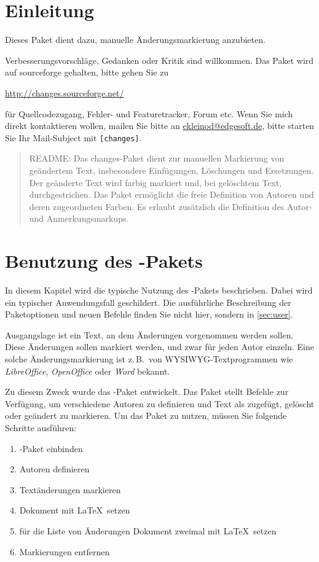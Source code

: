 \section{Einleitung}

Dieses Paket dient dazu, manuelle Änderungsmarkierung anzubieten.

Verbesserungsvorschläge, Gedanken oder Kritik sind willkommen.
Das Paket wird auf sourceforge gehalten, bitte gehen Sie zu

\url{http://changes.sourceforge.net/}

für Quellcodezugang, Fehler- und Featuretracker, Forum etc.
Wenn Sie mich direkt kontaktieren wollen, mailen Sie bitte an \href{mailto:ekleinod@edgesoft.de}{ekleinod@edgesoft.de}, bitte starten Sie Ihr Mail-Subject mit \texttt{[changes]}.

\begin{quote}
	\small\textsc{README:}
	Das changes-Paket dient zur manuellen Markierung von geändertem Text, insbesondere Einfügungen, Löschungen und Ersetzungen.
	Der geänderte Text wird farbig markiert und, bei gelöschtem Text, durchgestrichen.
	Das Paket ermöglicht die freie Definition von Autoren und deren zugeordneten Farben.
	Es erlaubt zusätzlich die Definition des Autor- und Anmerkungsmarkups.
\end{quote}

\section{Benutzung des -Pakets}
\label{sec:usage}

In diesem Kapitel wird die typische Nutzung des -Pakets beschrieben.
Dabei wird ein typischer Anwendungsfall geschildert.
Die ausführliche Beschreibung der Paketoptionen und neuen Befehle finden Sie nicht hier, sondern in \autoref{sec:user}.

Ausgangslage ist ein Text, an dem Änderungen vorgenommen werden sollen.
Diese Änderungen sollen markiert werden, und zwar für jeden Autor einzeln.
Eine solche Änderungsmarkierung ist z.\,B.\ von WYSIWYG-Textprogrammen wie \emph{LibreOffice}, \emph{OpenOffice} oder \emph{Word} bekannt.

Zu diesem Zweck wurde das -Paket entwickelt.
Das Paket stellt Befehle zur Verfügung, um verschiedene Autoren zu definieren und Text als zugefügt, gelöscht oder geändert zu markieren.
Um das Paket zu nutzen, müssen Sie folgende Schritte ausführen:
\begin{enumerate}
	\item {}-Paket einbinden
	\item Autoren definieren
	\item Textänderungen markieren
	\item Dokument mit \LaTeX\ setzen
	\item für die Liste von Änderungen Dokument zweimal mit \LaTeX\ setzen
	\item Markierungen entfernen
\end{enumerate}

